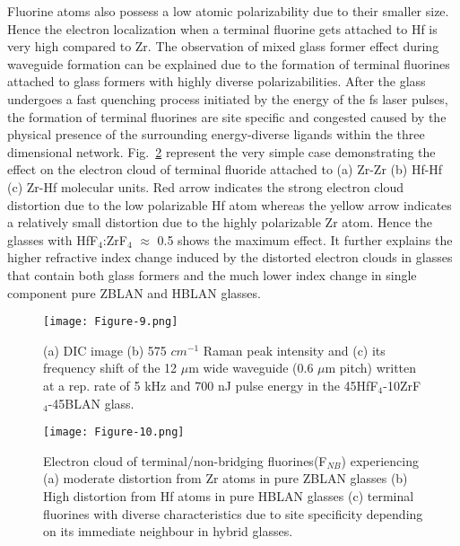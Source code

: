 \documentclass[11pt]{article}
\begin{document}
 Fluorine atoms also possess a low atomic polarizability due to their smaller size. Hence the electron localization when a terminal fluorine gets attached to Hf is very high compared to Zr. The observation of mixed glass former effect during waveguide formation can be explained due to the formation of terminal fluorines attached to glass formers with highly diverse polarizabilities. After the glass undergoes a fast quenching process initiated by the energy of the fs laser pulses, the formation of terminal fluorines are site specific and congested caused by the physical presence of the surrounding energy-diverse ligands within the three dimensional network. Fig.~\ref{Schematic} represent the very simple case demonstrating the effect on the electron cloud of terminal fluoride attached to (a) Zr-Zr (b) Hf-Hf (c) Zr-Hf molecular units. Red arrow indicates the strong electron cloud distortion due to the low polarizable Hf atom whereas the yellow arrow indicates a relatively small distortion due to the highly polarizable Zr atom.  Hence the glasses with HfF$_4$:ZrF$_4$ $\approx$ 0.5 shows the maximum effect. It further explains the higher refractive index change induced by the distorted electron clouds in glasses that contain both glass formers and the much lower index change in single component pure ZBLAN and HBLAN glasses.


\begin{figure}[ht]
\centering
\texttt{[image: Figure-9.png]}
     \caption{(a) DIC image (b) 575 $cm^{-1}$ Raman peak intensity and (c) its frequency shift of the 12 $\mu$m wide waveguide (0.6 $\mu$m pitch) written at a rep. rate of 5 kHz and 700 nJ pulse energy in the 45HfF$_4$-10ZrF$_4$-45BLAN glass. }
\label{Raman}
\end{figure}

\begin{figure}[ht]
\centering
\texttt{[image: Figure-10.png]}
     \caption{Electron cloud of terminal/non-bridging fluorines(F$_{NB}$) experiencing  (a) moderate distortion from Zr atoms in pure ZBLAN glasses (b) High distortion from Hf atoms in pure HBLAN glasses (c) terminal fluorines with diverse characteristics due to site specificity depending on its immediate neighbour in hybrid glasses.  }
\label{Schematic}
\end{figure}
\end{document}
